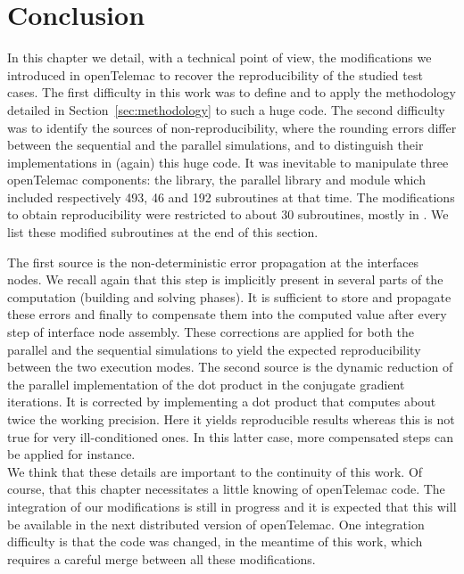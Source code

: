 \section{Conclusion}
%
In this chapter we detail, with a technical point of view,
the modifications we introduced in openTelemac to recover
the reproducibility of the studied test cases.
The first difficulty in this work was to define and
to apply the methodology detailed in Section~\ref{sec:methodology}
to such a huge code.
The second difficulty was to identify the sources of non-reproducibility,
\ie where the rounding errors differ between
the sequential and the parallel simulations, and to distinguish
their implementations in (again) this huge code.
%
It was inevitable to manipulate three openTelemac components:
the \bief library, the parallel library and  module
which included respectively 493, 46 and 192 subroutines at that time.
The modifications to obtain reproducibility were restricted to
about 30 subroutines, mostly in \bief.
We list these modified subroutines at the end of this section.

The first source is the non-deterministic error propagation at the interfaces nodes.
We recall again that this step is implicitly present in several parts of the
computation (building and solving phases).
It is sufficient to store and propagate these errors and finally to
compensate them into the computed value after every step of interface node
assembly.
These corrections are applied for both the parallel and the
sequential simulations to yield the expected reproducibility
between the two execution modes.
The second source is the dynamic reduction of the parallel
implementation of the dot product in the conjugate gradient
iterations. It is corrected by implementing a dot product that
computes about twice the working precision.
Here it yields reproducible results whereas this is not true
for very ill-conditioned ones. In this latter case, more compensated
steps can be applied for instance. \\

We think that these details are important to the continuity of this work.
Of course, that this chapter necessitates a little knowing of openTelemac code.
The integration of our modifications is still in progress and
it is expected that this will be
available in the next distributed version of openTelemac.
One integration difficulty is that the code
was changed, in the meantime of this work, which requires
a careful merge between all these modifications.
%
